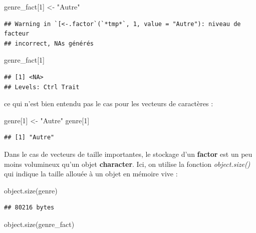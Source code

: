\documentclass[
]{book}
\newenvironment{Shaded}{\begin{snugshade}}{\end{snugshade}}
\newcommand{\DecValTok}[1]{\textcolor[rgb]{0.00,0.00,0.81}{#1}}
\newcommand{\FunctionTok}[1]{\textcolor[rgb]{0.00,0.00,0.00}{#1}}
\newcommand{\NormalTok}[1]{#1}
\newcommand{\OtherTok}[1]{\textcolor[rgb]{0.56,0.35,0.01}{#1}}
\newcommand{\StringTok}[1]{\textcolor[rgb]{0.31,0.60,0.02}{#1}}
\theoremstyle{definition}
\theoremstyle{definition}
\theoremstyle{definition}
\theoremstyle{definition}
\theoremstyle{remark}
\begin{document}
\begin{Shaded}
\begin{Highlighting}[]
\NormalTok{genre\_fact[}\DecValTok{1}\NormalTok{] }\OtherTok{\textless{}{-}} \StringTok{"Autre"}
\end{Highlighting}
\end{Shaded}

\begin{verbatim}
## Warning in `[<-.factor`(`*tmp*`, 1, value = "Autre"): niveau de facteur
## incorrect, NAs générés
\end{verbatim}

\begin{Shaded}
\begin{Highlighting}[]
\NormalTok{genre\_fact[}\DecValTok{1}\NormalTok{]}
\end{Highlighting}
\end{Shaded}

\begin{verbatim}
## [1] <NA>
## Levels: Ctrl Trait
\end{verbatim}

ce qui n'est bien entendu pas le cas pour les vecteurs de caractères :

\begin{Shaded}
\begin{Highlighting}[]
\NormalTok{genre[}\DecValTok{1}\NormalTok{] }\OtherTok{\textless{}{-}} \StringTok{"Autre"} 
\NormalTok{genre[}\DecValTok{1}\NormalTok{]}
\end{Highlighting}
\end{Shaded}

\begin{verbatim}
## [1] "Autre"
\end{verbatim}

Dans le cas de vecteurs de taille importantes, le stockage d'un \textbf{factor} est un peu moins volumineux qu'un objet \textbf{character}. Ici, on utilise la fonction \emph{object.size()} qui indique la taille allouée à un objet en mémoire vive :

\begin{Shaded}
\begin{Highlighting}[]
\FunctionTok{object.size}\NormalTok{(genre)}
\end{Highlighting}
\end{Shaded}

\begin{verbatim}
## 80216 bytes
\end{verbatim}

\begin{Shaded}
\begin{Highlighting}[]
\FunctionTok{object.size}\NormalTok{(genre\_fact)}
\end{Highlighting}
\end{Shaded}
\end{document}

